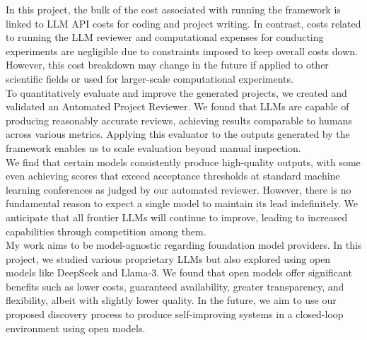 In this project, the bulk of the cost associated with running the framework is linked to LLM API costs for coding and project writing. In contrast, costs related to running the LLM reviewer and computational expenses for conducting experiments are negligible due to constraints imposed to keep overall costs down. However, this cost breakdown may change in the future if applied to other scientific fields or used for larger-scale computational experiments.\\
To quantitatively evaluate and improve the generated projects, we created and validated an Automated Project Reviewer. We found that LLMs are capable of producing reasonably accurate reviews, achieving results comparable to humans across various metrics. Applying this evaluator to the outputs generated by the framework enables us to scale evaluation beyond manual inspection.\\
We find that certain models consistently produce high-quality outputs, with some even achieving scores that exceed acceptance thresholds at standard machine learning conferences as judged by our automated reviewer. However, there is no fundamental reason to expect a single model to maintain its lead indefinitely. We anticipate that all frontier LLMs will continue to improve, leading to increased capabilities through competition among them.\\
My work aims to be model-agnostic regarding foundation model providers. In this project, we studied various proprietary LLMs but also explored using open models like DeepSeek and Llama-3. We found that open models offer significant benefits such as lower costs, guaranteed availability, greater transparency, and flexibility, albeit with slightly lower quality. In the future, we aim to use our proposed discovery process to produce self-improving systems in a closed-loop environment using open models.